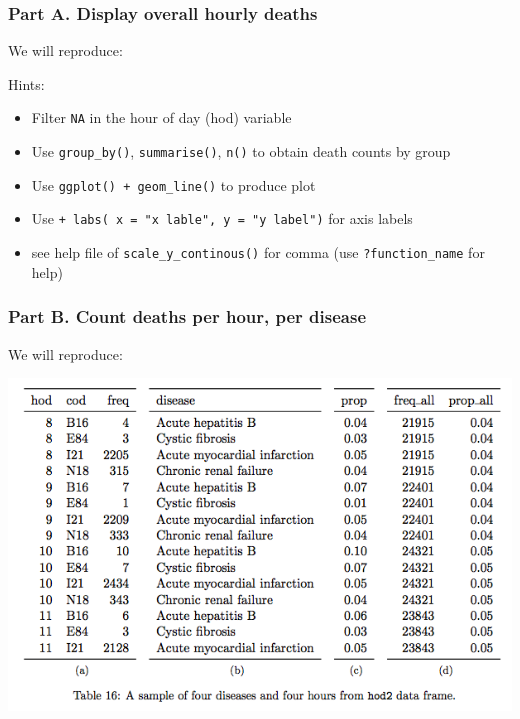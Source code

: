 \documentclass[]{book}
\theoremstyle{definition}
\theoremstyle{definition}
\theoremstyle{remark}
\begin{document}
\subsubsection*{Part A. Display overall hourly
deaths}\label{part-a.-display-overall-hourly-deaths}

We will reproduce:

Hints:

\begin{itemize}
\item
  Filter \texttt{NA} in the hour of day (hod) variable
\item
  Use \texttt{group\_by()}, \texttt{summarise()}, \texttt{n()} to obtain
  death counts by group
\item
  Use \texttt{ggplot()\ +\ geom\_line()} to produce plot
\item
  Use \texttt{+\ labs(\ x\ =\ "x\ lable",\ y\ =\ "y\ label")} for axis
  labels
\item
  see help file of \texttt{scale\_y\_continous()} for comma (use
  \texttt{?function\_name} for help)
\end{itemize}

\subsubsection*{Part B. Count deaths per hour, per
disease}\label{part-b.-count-deaths-per-hour-per-disease}

We will reproduce:

\begin{center}\includegraphics[width=0.9\linewidth]{tidy_case_study/table16} \end{center}
\end{document}

